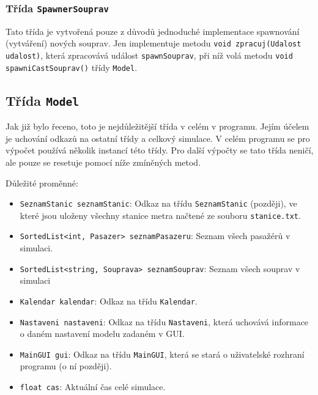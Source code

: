 \documentclass[12pt, a4paper]{article}
\begin{document}
\subsubsection{Třída \texttt{SpawnerSouprav}}
Tato třída je vytvořená pouze z důvodů jednoduché implementace spawnování (vytváření) nových souprav. Jen implementuje metodu \texttt{void zpracuj(Udalost udalost)}, která zpracovává událost \texttt{spawnSouprav}, při níž volá metodu \texttt{void spawniCastSouprav()} třídy \texttt{Model}.

\subsection{Třída \texttt{Model}}
Jak již bylo řeceno, toto je nejdůležitější třída v celém v programu. Jejím účelem je uchování odkazů na ostatní třídy a celkový  simulace. V celém programu se pro výpočet používá několik instancí této třídy. Pro další výpočty se tato třída neničí, ale pouze se resetuje pomocí níže zmíněných metod.

Důležité proměnné:
\begin{itemize}
    \item \texttt{SeznamStanic seznamStanic}: Odkaz na třídu \texttt{SeznamStanic} (později), ve které jsou uloženy všechny stanice metra načtené ze souboru \texttt{stanice.txt}.
    \item \texttt{SortedList<int, Pasazer> seznamPasazeru}: Seznam všech pasažérů v simulaci.
    \item \texttt{SortedList<string, Souprava> seznamSouprav}: Seznam všech souprav v simulaci
    \item \texttt{Kalendar kalendar}: Odkaz na třídu \texttt{Kalendar}.
    \item \texttt{Nastaveni nastaveni}: Odkaz na třídu \texttt{Nastaveni}, která uchovává informace o daném nastavení modelu zadaném v GUI.
    \item \texttt{MainGUI gui}: Odkaz na třídu \texttt{MainGUI}, která se stará o uživatelské rozhraní programu (o ní později).
    \item \texttt{float cas}: Aktuální čas celé simulace.
\end{itemize}
\end{document}

